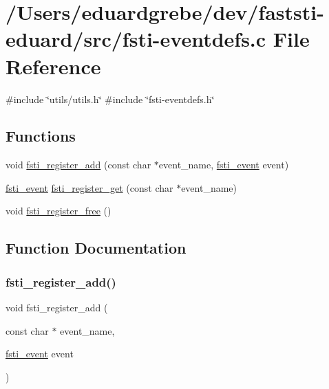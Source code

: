 \hypertarget{fsti-eventdefs_8c}{}\section{/\+Users/eduardgrebe/dev/faststi-\/eduard/src/fsti-\/eventdefs.c File Reference}
\label{fsti-eventdefs_8c}
{\ttfamily \#include \char`\"{}utils/utils.\+h\char`\"{}}\newline
{\ttfamily \#include \char`\"{}fsti-\/eventdefs.\+h\char`\"{}}\newline
\subsection*{Functions}
\begin{DoxyCompactItemize}
\item 
void \mbox{\hyperlink{fsti-eventdefs_8c_aa0b6464d8da748522498a11bc033fee1}{fsti\+\_\+register\+\_\+add}} (const char $\ast$event\+\_\+name, \mbox{\hyperlink{fsti-eventdefs_8h_abce6b23e84620b4f4433c952fa10f0b9}{fsti\+\_\+event}} event)
\item 
\mbox{\hyperlink{fsti-eventdefs_8h_abce6b23e84620b4f4433c952fa10f0b9}{fsti\+\_\+event}} \mbox{\hyperlink{fsti-eventdefs_8c_ab8a67816c82580412dd9c89b610d43ef}{fsti\+\_\+register\+\_\+get}} (const char $\ast$event\+\_\+name)
\item 
void \mbox{\hyperlink{fsti-eventdefs_8c_a57f74d766c59e7d2ad998981c4c00a1e}{fsti\+\_\+register\+\_\+free}} ()
\end{DoxyCompactItemize}


\subsection{Function Documentation}
\mbox{\label{fsti-eventdefs_8c_aa0b6464d8da748522498a11bc033fee1}} 
\subsubsection{\texorpdfstring{fsti\+\_\+register\+\_\+add()}{fsti\_register\_add()}}
{\footnotesize\ttfamily void fsti\+\_\+register\+\_\+add (\begin{DoxyParamCaption}\item[{const char $\ast$}]{event\+\_\+name,  }\item[{\mbox{\hyperlink{fsti-eventdefs_8h_abce6b23e84620b4f4433c952fa10f0b9}{fsti\+\_\+event}}}]{event }\end{DoxyParamCaption})}

